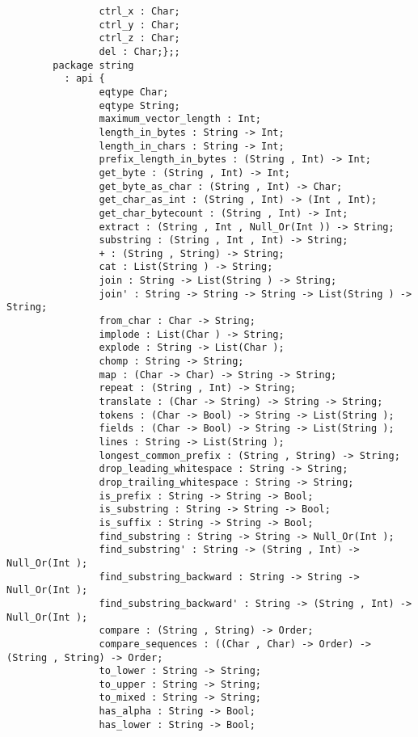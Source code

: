 \begin{verbatim}
                ctrl_x : Char;
                ctrl_y : Char;
                ctrl_z : Char;
                del : Char;};;
        package string
          : api {
                eqtype Char;
                eqtype String;
                maximum_vector_length : Int;
                length_in_bytes : String -> Int;
                length_in_chars : String -> Int;
                prefix_length_in_bytes : (String , Int) -> Int;
                get_byte : (String , Int) -> Int;
                get_byte_as_char : (String , Int) -> Char;
                get_char_as_int : (String , Int) -> (Int , Int);
                get_char_bytecount : (String , Int) -> Int;
                extract : (String , Int , Null_Or(Int )) -> String;
                substring : (String , Int , Int) -> String;
                + : (String , String) -> String;
                cat : List(String ) -> String;
                join : String -> List(String ) -> String;
                join' : String -> String -> String -> List(String ) -> String;
                from_char : Char -> String;
                implode : List(Char ) -> String;
                explode : String -> List(Char );
                chomp : String -> String;
                map : (Char -> Char) -> String -> String;
                repeat : (String , Int) -> String;
                translate : (Char -> String) -> String -> String;
                tokens : (Char -> Bool) -> String -> List(String );
                fields : (Char -> Bool) -> String -> List(String );
                lines : String -> List(String );
                longest_common_prefix : (String , String) -> String;
                drop_leading_whitespace : String -> String;
                drop_trailing_whitespace : String -> String;
                is_prefix : String -> String -> Bool;
                is_substring : String -> String -> Bool;
                is_suffix : String -> String -> Bool;
                find_substring : String -> String -> Null_Or(Int );
                find_substring' : String -> (String , Int) -> Null_Or(Int );
                find_substring_backward : String -> String -> Null_Or(Int );
                find_substring_backward' : String -> (String , Int) -> Null_Or(Int );
                compare : (String , String) -> Order;
                compare_sequences : ((Char , Char) -> Order) -> (String , String) -> Order;
                to_lower : String -> String;
                to_upper : String -> String;
                to_mixed : String -> String;
                has_alpha : String -> Bool;
                has_lower : String -> Bool;

\end{verbatim}
